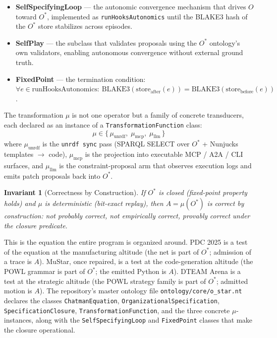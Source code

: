\documentclass[11pt,letterpaper]{article}
\newtheorem{invariant}{Invariant}
\begin{document}
\begin{itemize}[leftmargin=1.5em]
\item \textbf{SelfSpecifyingLoop} --- the autonomic convergence mechanism that drives $O$ toward $O^{\ast}$, implemented as \texttt{runHooksAutonomics} until the BLAKE3 hash of the $O^{\ast}$ store stabilizes across episodes.
\item \textbf{SelfPlay} --- the subclass that validates proposals using the $O^{\ast}$ ontology's own validators, enabling autonomous convergence without external ground truth.
\item \textbf{FixedPoint} --- the termination condition: $\forall e \in \mathrm{runHooksAutonomics}:\ \mathrm{BLAKE3}(\mathrm{store}_{\mathrm{after}}(e)) = \mathrm{BLAKE3}(\mathrm{store}_{\mathrm{before}}(e))$.
\end{itemize}

The transformation $\mu$ is not one operator but a family of concrete transducers, each declared as an instance of a \texttt{TransformationFunction} class:
\[
\mu \in \{\, \mu_{\mathrm{unrdf}},\; \mu_{\mathrm{mcp}},\; \mu_{\mathrm{llm}} \,\}
\]
where $\mu_{\mathrm{unrdf}}$ is the \texttt{unrdf sync} pass (SPARQL SELECT over $O^{\ast}$ + Nunjucks templates $\to$ code), $\mu_{\mathrm{mcp}}$ is the projection into executable MCP / A2A / CLI surfaces, and $\mu_{\mathrm{llm}}$ is the constraint-proposal arm that observes execution logs and emits patch proposals back into $O^{\ast}$.

\begin{invariant}[Correctness by Construction]
If $O^{\ast}$ is closed (fixed-point property holds) and $\mu$ is deterministic (bit-exact replay), then $A = \mu(O^{\ast})$ is correct by construction: \emph{not} probably correct, \emph{not} empirically correct, \emph{provably correct under the closure predicate}.
\end{invariant}

This is the equation the entire program is organized around. PDC 2025 is a test of the equation at the manufacturing altitude (the net is part of $O^{\ast}$; admission of a trace is $A$). MuStar, once repaired, is a test at the code-generation altitude (the POWL grammar is part of $O^{\ast}$; the emitted Python is $A$). DTEAM Arena is a test at the strategic altitude (the POWL strategy family is part of $O^{\ast}$; admitted motion is $A$). The repository's master ontology file \texttt{ontology/core/o\_star.nt} declares the classes \texttt{ChatmanEquation}, \texttt{OrganizationalSpecification}, \texttt{SpecificationClosure}, \texttt{TransformationFunction}, and the three concrete $\mu$-instances, along with the \texttt{SelfSpecifyingLoop} and \texttt{FixedPoint} classes that make the closure operational.
\end{document}
